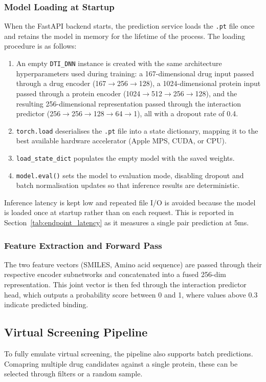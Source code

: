 \subsubsection{Model Loading at Startup}
When the FastAPI backend starts, the prediction service loads the \texttt{.pt} file once and retains the model in memory for the lifetime of the process.
The loading procedure is as follows:
\begin{enumerate}
    \item An empty \texttt{DTI\_DNN} instance is created with the same architecture hyperparameters used during training: a 167-dimensional drug input passed through a drug encoder (167$\rightarrow$256$\rightarrow$128), a 1024-dimensional protein input passed through a protein encoder (1024$\rightarrow$512$\rightarrow$256$\rightarrow$128), and the resulting 256-dimensional representation passed through the interaction predictor (256$\rightarrow$256$\rightarrow$128$\rightarrow$64$\rightarrow$1), all with a dropout rate of 0.4.
    \item \texttt{torch.load} deserialises the \texttt{.pt} file into a state dictionary, mapping it to the best available hardware accelerator (Apple MPS, CUDA, or CPU).
    \item \texttt{load\_state\_dict} populates the empty model with the saved weights.
    \item \texttt{model.eval()} sets the model to evaluation mode, disabling dropout and batch normalisation updates so that inference results are deterministic.
\end{enumerate}
Inference latency is kept low and repeated file I/O is avoided because the model is loaded once at startup rather than on each request.
This is reported in Section~\ref{tab:endpoint_latency} as it measures a single pair prediction at 5ms.

\subsubsection{Feature Extraction and Forward Pass}
The two feature vectors (SMILES, Amino acid sequence) are passed through their respective encoder subnetworks and concatenated into a fused 256-dim representation.
This joint vector is then fed through the interaction predictor head, which outputs a probability score between 0 and 1, where values above 0.3 indicate predicted binding.

\subsection{Virtual Screening Pipeline}
To fully emulate virtual screening, the pipeline also supports batch predictions.
Comapring multiple drug candidates against a single protein, these can be selected through filters or a random sample.

